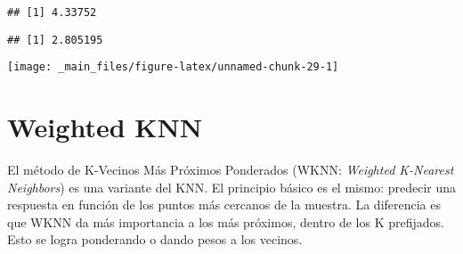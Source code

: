 \documentclass[]{book}
\newenvironment{Shaded}{\begin{snugshade}}{\end{snugshade}}
\newcommand{\CommentTok}[1]{\textcolor[rgb]{0.56,0.35,0.01}{\textit{#1}}}
\newcommand{\DataTypeTok}[1]{\textcolor[rgb]{0.13,0.29,0.53}{#1}}
\newcommand{\DecValTok}[1]{\textcolor[rgb]{0.00,0.00,0.81}{#1}}
\newcommand{\KeywordTok}[1]{\textcolor[rgb]{0.13,0.29,0.53}{\textbf{#1}}}
\newcommand{\NormalTok}[1]{#1}
\newcommand{\OperatorTok}[1]{\textcolor[rgb]{0.81,0.36,0.00}{\textbf{#1}}}
\newcommand{\StringTok}[1]{\textcolor[rgb]{0.31,0.60,0.02}{#1}}
\begin{document}
\begin{verbatim}
## [1] 4.33752
\end{verbatim}

\begin{Shaded}
\end{Shaded}

\begin{verbatim}
## [1] 2.805195
\end{verbatim}

\begin{Shaded}
\end{Shaded}

\begin{center}\texttt{[image: \_main\_files/figure-latex/unnamed-chunk-29-1]} \end{center}

\hypertarget{weighted-knn}{%
\section{Weighted KNN}\label{weighted-knn}}

El método de K-Vecinos Más Próximos Ponderados (WKNN: \emph{Weighted K-Nearest Neighbors}) es una variante del KNN. El principio básico es el mismo: predecir una respuesta en función de los puntos más cercanos de la muestra. La diferencia es que WKNN da más importancia a los más próximos, dentro de los K prefijados. Esto se logra ponderando o dando pesos a los vecinos.
\end{document}
